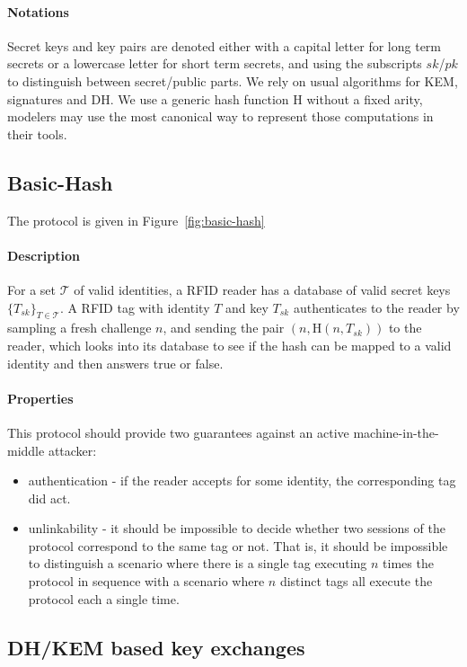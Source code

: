 \documentclass{article}
\newcommand{\sfsk}{\mathit{sk}}
\newcommand{\sfpk}{\mathit{pk}}
\newcommand{\kwf}[1]{\mathrm{#1}}
\newcommand{\hash}{\kwf{H}}
\begin{document}
\paragraph{Notations} Secret keys and key pairs are denoted either with a capital letter for long term secrets or a lowercase letter for short term secrets, and using the subscripts $\sfsk$/$\sfpk$ to distinguish between secret/public parts. We rely on usual algorithms for KEM, signatures and DH. We use a generic hash function $\hash$ without a fixed arity, modelers may use the most canonical way to represent those computations in their tools.

\subsection{Basic-Hash}

The protocol is given in Figure~\ref{fig:basic-hash}

\paragraph{Description} For a set $\mathcal{T}$ of valid identities, a RFID reader has a database of valid secret keys $\{T_\sfsk\}_{T \in \mathcal{T}}$. A RFID tag with identity $T$ and key $T_\sfsk$ authenticates to the reader by sampling a fresh challenge $n$, and sending the pair $(n,\hash(n,T_\sfsk))$ to the reader, which looks into its database to see if the hash can be mapped to a valid identity and then answers true or false.


\paragraph{Properties} This protocol should provide two guarantees against an active machine-in-the-middle attacker:
\begin{itemize}
\item authentication - if the reader accepts for some identity, the corresponding tag did act.
\item unlinkability - it should be impossible to decide whether two sessions of the protocol correspond to the same tag or not. That is, it should be impossible to distinguish a scenario where there is a single tag executing $n$ times the protocol in sequence with a scenario where $n$ distinct tags all execute the protocol each a single time. 
\end{itemize}

\subsection{DH/KEM based key exchanges}
\end{document}
